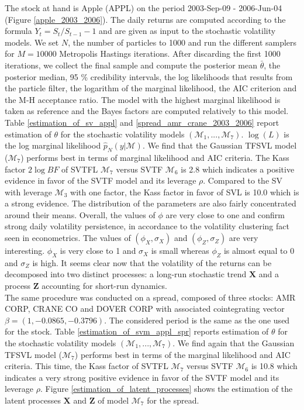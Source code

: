 \documentclass[11pt,a4,twosided,singlespacing,titlepagenumber=on]{scrreprt}
\numberwithin{equation}{chapter} %
\theoremstyle{remark}
\newcommand{\matr}[1]{\mathbf{#1}}
\begin{document}
The stock at hand is Apple (APPL) on the period 2003-Sep-09 - 2006-Jun-04 (Figure \ref{apple_2003_2006}). The daily returns are computed according to the formula $Y_t = S_t / S_{t-1} - 1$ and are given as input to the stochastic volatility models. We set $N$, the number of particles to 1000 and run the different samplers for $M = 10000$ Metropolis Hastings iterations. After discarding the first 1000 iterations, we collect the final sample and compute the posterior mean $\bar{\theta}$, the posterior median, 95 \% credibility intervals, the log likelihoods that results from the particle filter, the logarithm of the marginal likelihood, the AIC criterion and the M-H acceptance ratio. The model with the highest marginal likelihood is taken as reference and the Bayes factors are computed relatively to this model. Table \ref{estimation_of_sv_appl} and \ref{spread_amr_crane_2003_2006} report estimation of $\theta$ for the stochastic volatility models $(\mathcal{M}_1, ..., \mathcal{M}_7)$. $\log (L)$ is the log marginal likelihood $\hat{p}_N(y| \mathcal{M})$. We find that the Gaussian TFSVL model ($\mathcal{M}_7$) performs best in terms of marginal likelihood and AIC criteria. The Kass factor $2 \log BF$ of SVTFL $\mathcal{M}_7$ versus SVTF $\mathcal{M}_6$ is 2.8 which indicates a positive evidence in favor of the SVTF model and its leverage $\rho$. Compared to the SV with leverage $\mathcal{M}_3$ with one factor, the Kass factor in favor of SVL is 10.0 which is a strong evidence. The distribution of the parameters are also fairly concentrated around their means. Overall, the values of $\phi$ are very close to one and confirm strong daily volatility persistence, in accordance to the volatility clustering fact seen in econometrics. The values of $(\phi_X, \sigma_X)$ and $(\phi_Z, \sigma_Z)$ are very interesting. $\phi_X$ is very close to 1 and $\sigma_X$ is small whereas $\phi_Z$ is almost equal to 0 and $\sigma_Z$ is high. It seems clear now that the volatility of the returns can be decomposed into two distinct processes: a long-run stochastic trend $\matr{X}$ and a process $\matr{Z}$ accounting for short-run dynamics. \\

The same procedure was conducted on a spread, composed of three stocks: AMR CORP, CRANE CO and DOVER CORP with associated cointegrating vector $\beta = (1, -0.0865, -0.3796)$. The considered period is the same as the one used for the stock. Table \ref{estimation_of_svm_appl_spr} reports estimation of $\theta$ for the stochastic volatility models $(\mathcal{M}_1, ..., \mathcal{M}_7)$. We find again that the Gaussian TFSVL model ($\mathcal{M}_7$) performs best in terms of the marginal likelihood and AIC criteria. This time, the Kass factor of SVTFL $\mathcal{M}_7$ versus SVTF $\mathcal{M}_6$ is 10.8 which indicates a very strong positive evidence in favor of the SVTF model and its leverage $\rho$. Figure \ref{estimation_of_latent_processes} shows the estimation of the latent processes $\matr{X}$ and $\matr{Z}$ of model $\mathcal{M}_7$ for the spread. 
\end{document}
